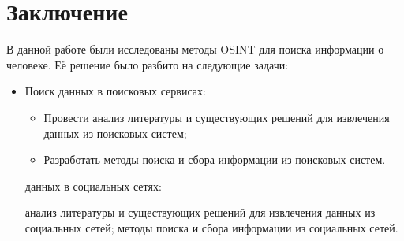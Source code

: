 \section{Заключение}
\label{sec:Chapter5} 
В данной работе были исследованы методы OSINT для поиска информации о человеке. Её решение было разбито на следующие задачи:
\begin{itemize}
    \item Поиск данных в поисковых сервисах:
    \begin{itemize}
        \item Провести анализ литературы и существующих решений для извлечения данных из поисковых систем;
        \item Разработать методы поиска и сбора информации из поисковых систем.
    \end{itemize}
     данных в социальных сетях:
    \begin{itemize}
         анализ литературы и существующих решений для извлечения данных из социальных сетей;
         методы поиска и сбора информации из социальных сетей.
    \end{itemize}
\end{itemize}